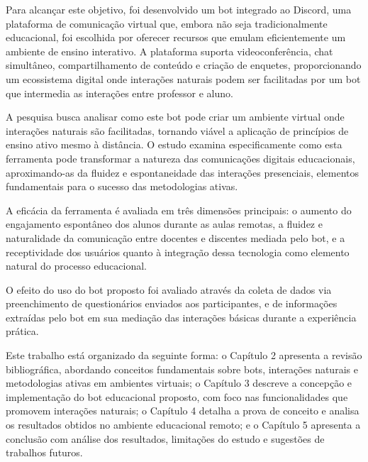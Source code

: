 Para alcançar este objetivo, foi desenvolvido um bot integrado ao Discord, uma plataforma de comunicação virtual que, embora não seja tradicionalmente educacional, foi escolhida por oferecer recursos que emulam eficientemente um ambiente de ensino interativo. A plataforma suporta videoconferência, chat simultâneo, compartilhamento de conteúdo e criação de enquetes, proporcionando um ecossistema digital onde interações naturais podem ser facilitadas por um bot que intermedia as interações entre professor e aluno.

A pesquisa busca analisar como este bot pode criar um ambiente virtual onde interações naturais são facilitadas, tornando viável a aplicação de princípios de ensino ativo mesmo à distância. O estudo examina especificamente como esta ferramenta pode transformar a natureza das comunicações digitais educacionais, aproximando-as da fluidez e espontaneidade das interações presenciais, elementos fundamentais para o sucesso das metodologias ativas.

A eficácia da ferramenta é avaliada em três dimensões principais: o aumento do engajamento espontâneo dos alunos durante as aulas remotas, a fluidez e naturalidade da comunicação entre docentes e discentes mediada pelo bot, e a receptividade dos usuários quanto à integração dessa tecnologia como elemento natural do processo educacional.

O efeito do uso do bot proposto foi avaliado através da coleta de dados via preenchimento de questionários enviados aos participantes, e de informações extraídas pelo bot em sua mediação das interações básicas durante a experiência prática.

Este trabalho está organizado da seguinte forma: o Capítulo 2 apresenta a revisão bibliográfica, abordando conceitos fundamentais sobre bots, interações naturais e metodologias ativas em ambientes virtuais; o Capítulo 3 descreve a concepção e implementação do bot educacional proposto, com foco nas funcionalidades que promovem interações naturais; o Capítulo 4 detalha a prova de conceito e analisa os resultados obtidos no ambiente educacional remoto; e o Capítulo 5 apresenta a conclusão com análise dos resultados, limitações do estudo e sugestões de trabalhos futuros.

